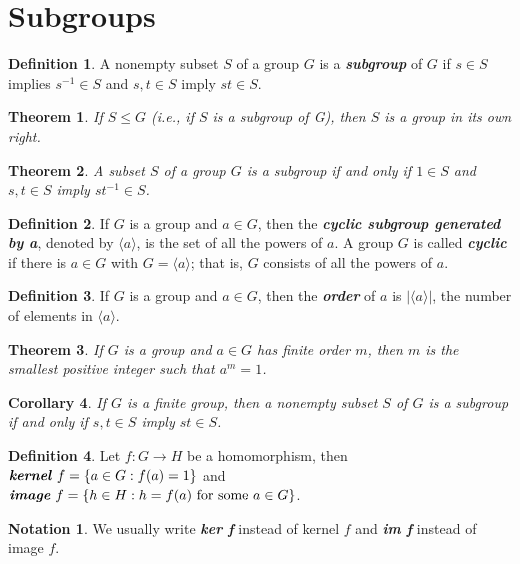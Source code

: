 \documentclass[10pt]{report}
\newtheorem{theorem}{Theorem}[chapter]
\newtheorem{corollary}[theorem]{Corollary}
\theoremstyle{definition}
\newtheorem*{definition}{Definition}
\newtheorem*{notation}{Notation}
\newcommand{\term}[1]{\textbf{\textit{#1}}}
\newcommand{\gen}[1]{{\langle}#1{\rangle}}
\begin{document}
\section{Subgroups}
\begin{definition}
	A nonempty subset $S$ of a group $G$ is a \term{subgroup} of $G$
	if $s\in S$ implies $s^{-1}\in S$ and $s, t\in S$ imply $st\in S$.
\end{definition}

\begin{theorem}
	If $S\leq G$ (i.e., if $S$ is a subgroup of G), then $S$ is a group in its own right.
\end{theorem}

\begin{theorem}
	A subset $S$ of a group $G$ is a subgroup if and only if $1\in S$ and $s, t\in S$ imply $st^{-1}\in S$.
\end{theorem}

\begin{definition}
	If $G$ is a group and $a\in G$, then the \term{cyclic subgroup generated by a}, denoted by $\gen{a}$, is the set of all the powers of $a$.
	A group $G$ is called \term{cyclic} if there is $a\in G$ with $G=\gen{a}$; that is, $G$ consists of all the powers of $a$.
\end{definition}

\begin{definition}
	If $G$ is a group and $a\in G$, then the \term{order} of $a$ is $|\gen{a}|$, the number of elements in $\gen{a}$.
\end{definition}

\begin{theorem}
	If $G$ is a group and $a\in G$ has finite order $m$, then $m$ is the smallest positive integer such that $a^m=1$.
\end{theorem}

\begin{corollary}
	If $G$ is a finite group, then a nonempty subset $S$ of $G$ is a subgroup if and only if $s, t\in S$ imply $st \in S$.
\end{corollary}

\begin{definition}
	Let $f:G\to H$ be a homomorphism, then $\term{kernel}\ f = \{ a\in G: f(a)=1\}$ and $\term{image}\ f = \{ h\in H: h=f(a) \text{ for some } a\in G \}$.
\end{definition}

\begin{notation}
	We usually write \term{ker f} instead of kernel $f$ and \term{im f} instead of image $f$.
\end{notation}
\end{document}
